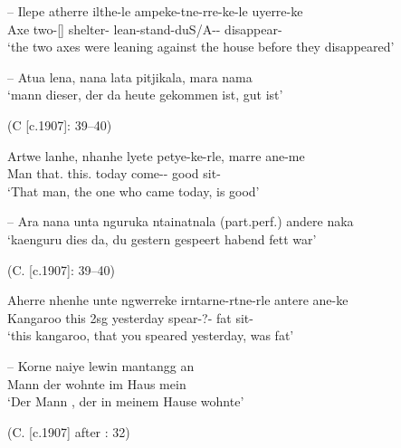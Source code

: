 \documentclass{langscibook}
\begin{document}
\begin{xlist}
\begin{xlist}
\begin{xlist}
--
\ea
\gll  Ilepe   atherre             ilthe-le         ampeke-tne-rre-ke-le               uyerre-ke\\
Axe    two-[]       shelter-    lean-stand-duS/A{}--      disappear-\\
\glt `the two axes were leaning against the house before they disappeared'
\z





--
\ea
\label{bkm:Ref339794050}Atua       lena,                    nana              lata               pitjikala,          mara       nama\\
\glt `mann dieser, der da heute gekommen ist, gut ist'

 (C \citealt{strehlow_untitled_1931} [c.1907]: 39--40)

\gll Artwe      lanhe,                nhanhe          lyete      petye-ke-rle,             marre    ane-me\\
Man        that.          this.      today    come--      good      sit-\\
\glt `That man, the one who came today, is good'
\z

--
\ea
     \label{bkm:Ref339788704}Ara     nana         unta              nguruka         ntainatnala (part.perf.)   andere    naka\\
\glt `kaenguru dies da, du gestern gespeert habend  fett war'

(C. \citealt{strehlow_untitled_1931} [c.1907]: 39--40)

\gll Aherre     nhenhe      unte              ngwerreke     irntarne-rtne-rle              antere      ane-ke\\
Kangaroo   this         2sg      yesterday       spear-?-      fat             sit-\\
\glt `this kangaroo, that you speared yesterday, was fat'
\z

--
\ea
\gll    \label{bkm:Ref339788405}Korne    naiye    lewin    mantangg  an\\
Mann      der       wohnte im Haus  mein\\
\glt `Der Mann , der in meinem Hause wohnte'

(C. \citealt{strehlow_grammatik_1931} [c.1907] after \citet{meyer_vocabulary_1843}: 32)
\z




\end{xlist}
\end{xlist}
\end{xlist}
\end{document}
